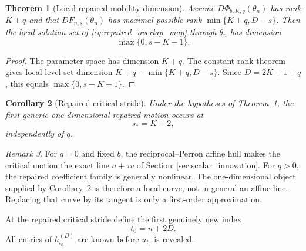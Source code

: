 \documentclass[11pt]{amsart}
\numberwithin{equation}{section}
\theoremstyle{plain}
\newtheorem{theorem}{Theorem}[section]
\newtheorem{corollary}[theorem]{Corollary}
\theoremstyle{definition}
\theoremstyle{remark}
\newtheorem{remark}[theorem]{Remark}
\begin{document}
\begin{theorem}[Local repaired mobility dimension]
\label{thm:repaired_mobility_dimension}
Assume $D\Phi_{b,K,q}(\theta_n)$ has rank $K+q$ and that $DF_{n,s}(\theta_n)$ has maximal possible rank $\min\{K+q,D-s\}$. Then the local solution set of \eqref{eq:repaired_overlap_map} through $\theta_n$ has dimension
\begin{equation}
\boxed{\max\{0,s-K-1\}.}
\label{eq:repaired_generic_mobility}
\end{equation}
\end{theorem}

\begin{proof}
The parameter space has dimension $K+q$. The constant-rank theorem gives local level-set dimension $K+q-\min\{K+q,D-s\}$. Since $D=2K+1+q$, this equals $\max\{0,s-K-1\}$.
\end{proof}

\begin{corollary}[Repaired critical stride]
\label{cor:repaired_critical_stride}
Under the hypotheses of Theorem~\ref{thm:repaired_mobility_dimension}, the first generic one-dimensional repaired motion occurs at
\begin{equation}\boxed{s_*=K+2,}\label{eq:repaired_critical_stride}\end{equation}
independently of $q$.
\end{corollary}

\begin{remark}
\label{rem:rigid_line_repaired_curve}
For $q=0$ and fixed $b$, the reciprocal--Perron affine hull makes the critical motion the exact line $a+\tau v$ of Section~\ref{sec:scalar_innovation}. For $q>0$, the repaired coefficient family is generally nonlinear. The one-dimensional object supplied by Corollary~\ref{cor:repaired_critical_stride} is therefore a local curve, not in general an affine line. Replacing that curve by its tangent is only a first-order approximation.
\end{remark}

At the repaired critical stride define the first genuinely new index
\begin{equation}t_0=n+2D.\label{eq:repaired_first_new_time}\end{equation}
All entries of $h^{(D)}_{t_0}$ are known before $u_{t_0}$ is revealed.
\end{document}
